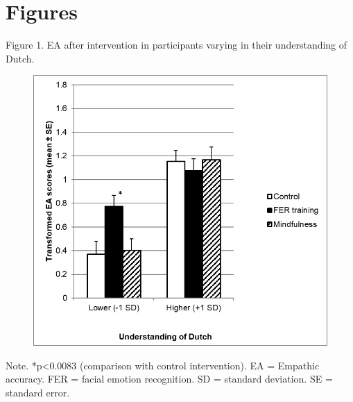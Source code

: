 \documentclass[authordate, empirical]{jote-new-article}
\begin{document}
\section{Figures}



Figure 1. EA after intervention in participants varying in their understanding of Dutch.



        \begin{figure}
            \includegraphics[width=\linewidth]{media/image1.png}

            \caption{}

            \label{fig:rId12}


        \end{figure}
        
Note. *p<0.0083 (comparison with control intervention). EA = Empathic accuracy. FER = facial emotion recognition. SD = standard deviation. SE = standard error.
\end{document}
